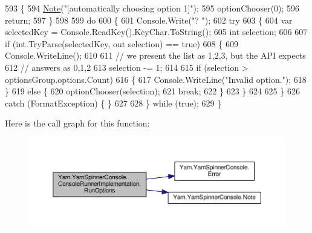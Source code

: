 \begin{DoxyCode}
593                 \{
594                     \hyperlink{a00189_a939cc9e943c574b36c6af93e9c772702}{Note}(\textcolor{stringliteral}{"[automatically choosing option 1]"});
595                     optionChooser(0);
596                     \textcolor{keywordflow}{return};
597                 \}
598 
599                 \textcolor{keywordflow}{do}
600                 \{
601                     Console.Write(\textcolor{stringliteral}{"? "});
602                     \textcolor{keywordflow}{try}
603                     \{
604                         var selectedKey = Console.ReadKey().KeyChar.ToString();
605                         \textcolor{keywordtype}{int} selection;
606 
607                         \textcolor{keywordflow}{if} (\textcolor{keywordtype}{int}.TryParse(selectedKey, out selection) == \textcolor{keyword}{true})
608                         \{
609                             Console.WriteLine();
610 
611                             \textcolor{comment}{// we present the list as 1,2,3, but the API expects}
612                             \textcolor{comment}{// answers as 0,1,2}
613                             selection -= 1;
614 
615                             \textcolor{keywordflow}{if} (selection > optionsGroup.options.Count)
616                             \{
617                                 Console.WriteLine(\textcolor{stringliteral}{"Invalid option."});
618                             \}
619                             \textcolor{keywordflow}{else} \{
620                                 optionChooser(selection);
621                                 \textcolor{keywordflow}{break};
622                             \}
623                         \}
624 
625                     \}
626                     \textcolor{keywordflow}{catch} (FormatException) \{ \}
627 
628                 \} \textcolor{keywordflow}{while} (\textcolor{keyword}{true});
629             \}
\end{DoxyCode}


Here is the call graph for this function\-:
\nopagebreak
\begin{figure}[H]
\begin{center}
\leavevmode
\includegraphics[width=350pt]{a00050_a62674694fa65e5ae8c0c0da4fbceda51_cgraph}
\end{center}
\end{figure}


